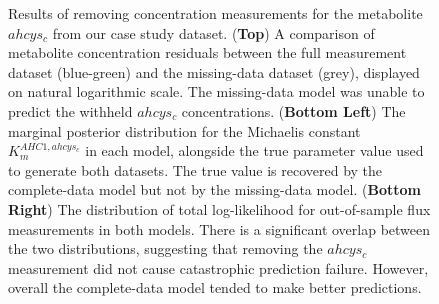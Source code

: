\documentclass[journal=,manuscript=]{achemso}
\begin{document}
\begin{figure}

\begin{minipage}[t]{\linewidth}

{\centering 


}

\end{minipage}%

\caption{\label{fig-missing}Results of removing concentration
measurements for the metabolite \(ahcys_c\) from our case study dataset.
(\textbf{Top}) A comparison of metabolite concentration residuals
between the full measurement dataset (blue-green) and the missing-data
dataset (grey), displayed on natural logarithmic scale. The missing-data
model was unable to predict the withheld \(ahcys_c\) concentrations.
(\textbf{Bottom Left}) The marginal posterior distribution for the
Michaelis constant \(K_m^{AHC1,ahcys_c}\) in each model, alongside the
true parameter value used to generate both datasets. The true value is
recovered by the complete-data model but not by the missing-data model.
(\textbf{Bottom Right}) The distribution of total log-likelihood for
out-of-sample flux measurements in both models. There is a significant
overlap between the two distributions, suggesting that removing the
\(ahcys_c\) measurement did not cause catastrophic prediction failure.
However, overall the complete-data model tended to make better
predictions.}

\end{figure}
\end{document}

